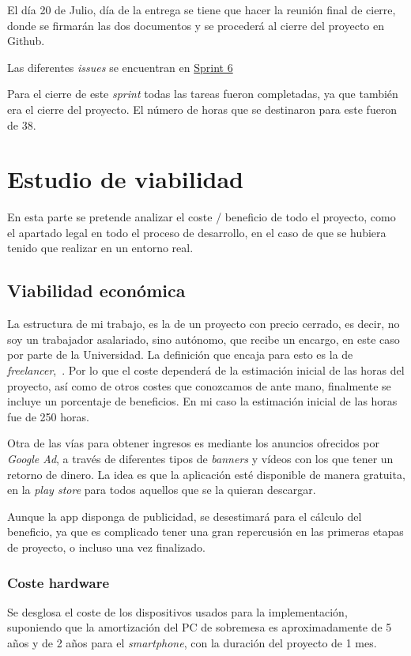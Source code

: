 El día 20 de Julio, día de la entrega se tiene que hacer la reunión final de cierre, donde se firmarán las dos documentos y se procederá al cierre del proyecto en Github.

Las diferentes \emph{issues} se encuentran en \href{https://github.com/scc0034/flutter_serpiente/milestone/6?closed=1}{Sprint 6}

Para el cierre de este \emph{sprint} todas las tareas fueron completadas, ya que también era el cierre del proyecto. El número de horas que se destinaron para este fueron de 38.


\section{Estudio de viabilidad}

En esta parte se pretende analizar el coste / beneficio de todo el proyecto, como el apartado legal en todo el proceso de desarrollo, en el caso de que se hubiera tenido que realizar en un entorno real. 


\subsection{Viabilidad económica}
La estructura de mi trabajo, es la de un proyecto con precio cerrado, es decir, no soy un trabajador asalariado, sino autónomo, que recibe un encargo, en este caso por parte de la Universidad. La definición que encaja para esto es la de \emph{freelancer},~\cite{noauthor_freelancercom_2020}. Por lo que el coste dependerá de la estimación inicial de las horas del proyecto, así como de otros costes que conozcamos de ante mano, finalmente se incluye un porcentaje de beneficios. En mi caso la estimación inicial de las horas fue de 250 horas.

Otra de las vías para obtener ingresos es mediante los anuncios ofrecidos por \emph{Google Ad}, a través de diferentes tipos de \emph{banners} y vídeos con los que tener un retorno de dinero. La idea es que la aplicación esté disponible de manera gratuita, en la \emph{play store} para todos aquellos que se la quieran descargar. 

Aunque la app disponga de publicidad, se desestimará para el cálculo del beneficio, ya que es complicado tener una gran repercusión en las primeras etapas de proyecto, o incluso una vez finalizado. 	

\subsubsection{Coste hardware}
Se desglosa el coste de los dispositivos usados para la implementación, suponiendo que la amortización del PC de sobremesa es aproximadamente de 5 años y de 2 años para el \emph{smartphone}, con la duración del proyecto de 1 mes.

